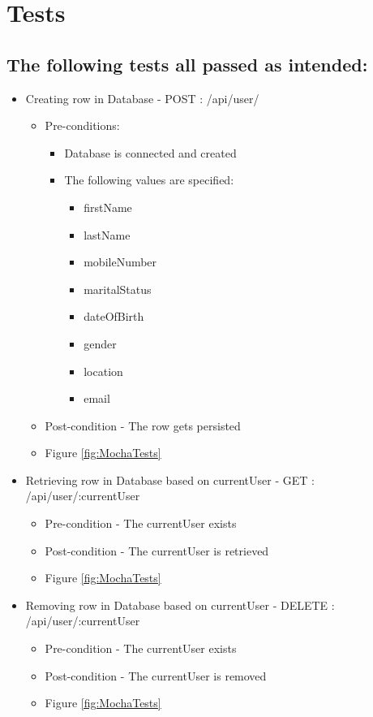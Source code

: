 \documentclass{article}
\begin{document}
\section{Tests}
\subsection{The following tests all passed as intended:}
\begin{itemize}
\item Creating row in Database - POST : /api/user/ 
	\begin{itemize}
	\item Pre-conditions:
		\begin{itemize}
		\item Database is connected and created
		\item The following values are specified:  
		\begin{itemize}
		\item firstName
  		\item lastName
  		\item mobileNumber 
  		\item maritalStatus 
  		\item dateOfBirth 
 		\item gender
  		\item location 
 		\item email
 		\end{itemize} 
		\end{itemize}
	\item Post-condition - The row gets persisted
	\item Figure \ref{fig:MochaTests}
	\end{itemize}
	
	
\item Retrieving row in Database based on currentUser - GET : /api/user/:currentUser
	\begin{itemize}
	\item Pre-condition - The currentUser exists
	\item Post-condition - The currentUser is retrieved 
	\item Figure \ref{fig:MochaTests}
	\end{itemize}
	
\item Removing row in Database based on currentUser - DELETE : /api/user/:currentUser
	\begin{itemize}
	\item Pre-condition - The currentUser exists
	\item Post-condition - The currentUser is removed 
	\item Figure \ref{fig:MochaTests}
	\end{itemize}	




\end{itemize}
\end{document}
